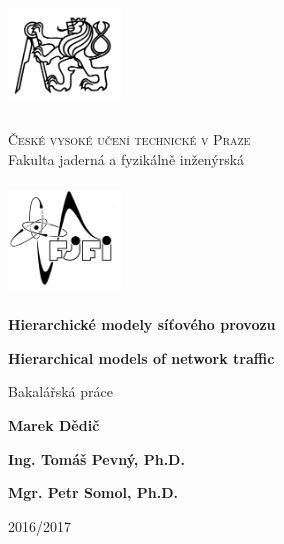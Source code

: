 \begin{center}
	\begin{minipage}{3cm}
		\includegraphics[width=3cm,height=3cm,keepaspectratio]{images/titlepage/cvut}
	\end{minipage}
	\begin{minipage}{0.6\linewidth}
		\begin{center}
			\textsc{\large České vysoké učení technické v Praze}\\
			{\large Fakulta jaderná a fyzikálně inženýrská}
		\end{center}
	\end{minipage}
	\begin{minipage}{3cm}
		\includegraphics[width=3cm,height=3cm,keepaspectratio]{images/titlepage/fjfi}
	\end{minipage}

	\vspace{3.3cm}

	\textbf{\huge Hierarchické modely síťového provozu}
	\vspace{1.1cm}

	\textenglish{\textbf{\huge Hierarchical models of network traffic}}
	\vspace{1.7cm}

	{\large Bakalářská práce}
\end{center}

\vfill

\begin{list}{}{
	\settowidth{\labelwidth}{MMMMMMMMM}
	\setlength{\leftmargin}{\labelwidth}
	\renewcommand{\makelabel}[1]{#1\hfil}}
	\item [{Autor:}] \textbf{Marek Dědič}
	\item [{Vedoucí práce:}] \textbf{Ing. Tomáš Pevný, Ph.D.}
	\item [{Konzultant:}] \textbf{Mgr. Petr Somol, Ph.D.}
	\item [{Akademický rok:}] 2016/2017
\end{list}
